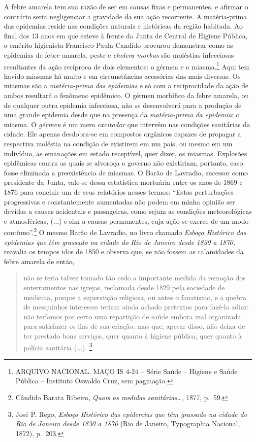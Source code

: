 A febre amarela tem sua razão de ser em causas fixas e permanentes, e
afirmar o contrário seria negligenciar a gravidade da sua ação
recorrente. A matéria-prima das epidemias reside nas condições naturais
e históricas da região habitada. Ao final dos 13 anos em que esteve à
frente da Junta de Central de Higiene Pública, o emérito higienista
Francisco Paula Candido procurou demonstrar como as epidemias de febre
amarela, peste e \emph{cholera morbus} são moléstias infecciosas
resultantes da ação recíproca de dois elementos: o gérmen e o
miasma.\footnote{ARQUIVO NACIONAL. MAÇO IS 4-24 -- Série Saúde --
  Higiene e Saúde Pública -- Instituto Oswaldo Cruz, sem paginação.}
Aqui tem havido miasmas há muito e em circunstâncias acessórias das mais
diversas. Os miasmas são a \emph{matéria-prima das epidemias} e só com a
reciprocidade da ação de ambos resultará o fenômeno epidêmico. O gérmen
morbífico da febre amarela, ou de qualquer outra epidemia infecciosa,
não se desenvolverá para a produção de uma grande epidemia desde que na
presença da \emph{matéria-prima da epidemia}: o miasma. O \emph{gérmen}
é um mero \emph{excitador} que intervém nas condições sanitárias da
cidade. Ele apenas desdobra-se em compostos orgânicos capazes de
propagar a respectiva moléstia na condição de existirem em um país, ou
mesmo em um indivíduo, as emanações em estado receptível, quer dizer, os
miasmas. Explosões epidêmicas contra as quais se alvoroça o governo não
existiriam, portanto, caso fosse eliminada a preexistência de miasmas. O
Barão de Lavradio, sucessor como presidente da Junta, vale-se dessa
estatística mortuária entre os anos de 1869 e 1876 para concluir um de
seus relatórios nesses termos: ``Estas perturbações progressivas e
constantemente aumentadas não podem em minha opinião ser devidas a
causas acidentais e passageiras, como sejam as condições meteorológicas
e atmosféricas, (...) e sim a causas permanentes, cuja ação se exerce de
um modo contínuo''.\footnote{Cândido Barata Ribeiro, \emph{Quais as
  medidas sanitárias\ldots{}}, 1877, p.~59.} O mesmo Barão de Lavradio,
no livro chamado \emph{Esboço Histórico das epidemias que têm grassado
na cidade do Rio de Janeiro desde 1830 a 1870,} reavalia os tempos idos
de 1850 e observa que, se não fossem as calamidades da febre amarela de
então,

\begin{quote}
não se teria talvez tomado tão cedo a importante medida da remoção dos
enterramentos nas igrejas, reclamada desde 1829 pela sociedade de
medicina, porque a superstição religiosa, ou antes o fanatismo, e a
quebra de mesquinhos interesses teriam ainda achado pretextos para
fazê-la adiar; não teríamos por certo uma repartição de saúde embora mal
organizada para satisfazer os fins de sua criação, mas que, apesar
disso, não deixa de ter prestado bons serviços, quer quanto à higiene
pública, quer quanto à polícia sanitária (...). \footnote{José P. Rego,
  \emph{Esboço Histórico das epidemias que têm grassado na cidade do Rio
  de Janeiro desde 1830 a 1870} (Rio de Janeiro, Typographia Nacional,
  1872), p.~203.}
\end{quote}

